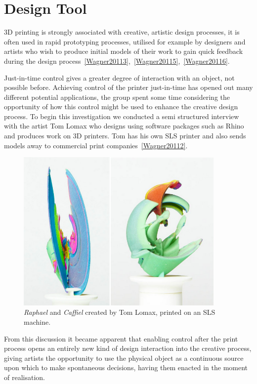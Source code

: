 \documentclass[11pt]{report} %
\begin{document}
\section{Design Tool}
3D printing is strongly associated with creative, artistic design processes, it is often used in rapid prototyping processes, utilised for example by designers and artists who wish to produce initial models of their work to gain quick feedback during the design process~\ref{Wagner20113},~\ref{Wagner20115},~\ref{Wagner20116}.

	Just-in-time control gives a greater degree of interaction with an object, not possible before. Achieving control of the printer just-in-time has opened out many different potential applications, the group spent some time considering the opportunity of how this control might be used to enhance the creative design process. To begin this investigation we conducted a semi structured interview with the artist Tom Lomax who designs using software packages such as Rhino and produces work on 3D printers. Tom has his own SLS printer and also sends models away to commercial print companies~\ref{Wagner20112}. 

\begin{figure}[H]
  \centering
  \includegraphics[width=4in]{Lomax.png}
  \caption{\textit{Raphael} and \textit{Caffiel} created by Tom Lomax, printed on an SLS machine.}
  \label{figure:Lomax}
\end{figure}

From this discussion it became apparent that enabling control after the print process opens an entirely new kind of design interaction into the creative process, giving artists the opportunity to use the physical object as a continuous source upon which to make spontaneous decisions, having them enacted in the moment of realisation. 
\end{document}
